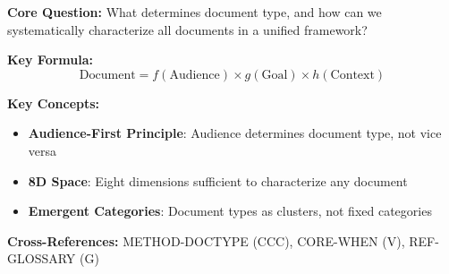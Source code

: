 \begin{abstract}
This appendix establishes the theoretical foundations for an 8-dimensional
framework of document types. Rather than treating document categories as
fixed taxonomies, we propose that document types emerge from the intersection
of audience characteristics and communication goals. Drawing on Halliday's
register theory, Swales' genre analysis, and List's critical thinking hierarchy,
we derive eight fundamental dimensions that characterize any document type.
This framework enables systematic document design and cross-cultural adaptation.
\end{abstract}

\begin{tcolorbox}[colback=blue!5!white, colframe=blue!75!black,
    title=Quick Reference: 8D Document Type Theory]

\textbf{Core Question:} What determines document type, and how can we
systematically characterize all documents in a unified framework?

\textbf{Key Formula:}
\begin{equation}
\text{Document} = f(\text{Audience}) \times g(\text{Goal}) \times h(\text{Context})
\end{equation}

\textbf{Key Concepts:}
\begin{itemize}[nosep]
\item \textbf{Audience-First Principle}: Audience determines document type, not vice versa
\item \textbf{8D Space}: Eight dimensions sufficient to characterize any document
\item \textbf{Emergent Categories}: Document types as clusters, not fixed categories
\end{itemize}

\textbf{Cross-References:} METHOD-DOCTYPE (CCC), CORE-WHEN (V), REF-GLOSSARY (G)
\end{tcolorbox}


